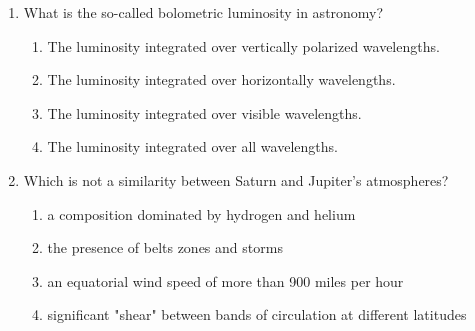 \documentclass[12pt]{article}
\begin{document}
\begin{enumerate}[label=\arabic*.]
\item What is the so-called bolometric luminosity in astronomy?
\begin{enumerate}[label=(\alph*)]
    \item The luminosity integrated over vertically polarized wavelengths.
    \item The luminosity integrated over horizontally wavelengths.
    \item The luminosity integrated over visible wavelengths.
    \item The luminosity integrated over all wavelengths.
\end{enumerate}
\item Which is not a similarity between Saturn and Jupiter's atmospheres?
\begin{enumerate}[label=(\alph*)]
    \item a composition dominated by hydrogen and helium
    \item the presence of belts zones and storms
    \item an equatorial wind speed of more than 900 miles per hour
    \item significant "shear" between bands of circulation at different latitudes
\end{enumerate}
\end{enumerate}
\end{document}
